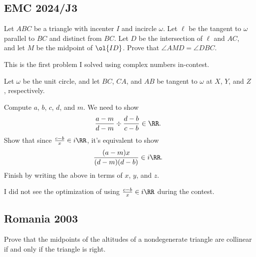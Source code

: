 \documentclass[11pt]{scrartcl}
\begin{document}
\pagebreak

\subsection{EMC 2024/J3}

\begin{example}[EMC 2024/J3]
	Let $ABC$ be a triangle with incenter $I$ and incircle $\omega$. Let $\ell$ be the tangent to $\omega$ parallel to $BC$ and distinct from $BC$. Let $D$ be the intersection of $\ell$ and $AC$, and let $M$ be the midpoint of $\ol{ID}$. Prove that $\angle AMD = \angle DBC$.
\end{example}

\begin{walkthrough}
	This is the first problem I solved using complex numbers in-contest.

	Let $\omega$ be the unit circle, and let $BC$, $CA$, and $AB$ be tangent to $\omega$ at $X$, $Y$, and $Z$, respectively.
	\begin{walk}
		\ii Compute $a$, $b$, $c$, $d$, and $m$.
		\ii We need to show
		\[\frac{a - m}{d - m} \div \frac{d - b}{c - b} \in \RR.\]
		Show that since $\frac{c - b}x \in i\RR$, it's equivalent to show
		\[\frac{(a - m)x}{(d - m)(d - b)} \in i\RR.\]
		\ii Finish by writing the above in terms of $x$, $y$, and $z$.
	\end{walk}
	I did not see the optimization of using $\frac{c - b}x \in i\RR$ during the contest.
\end{walkthrough}

\pagebreak

\subsection{Romania 2003}
\label{ssec:jacobi-warmup}

\begin{example}[Romania 2003]
	Prove that the midpoints of the altitudes of a nondegenerate triangle are collinear if and only if the triangle is right.
\end{example}
\end{document}
